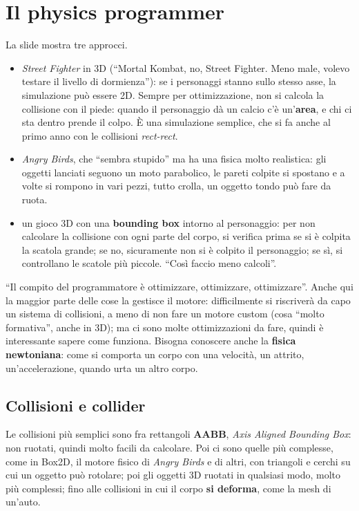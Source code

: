 \section{Il physics programmer}
\label{p5:sec:fisica}

La slide mostra tre approcci.
\begin{itemize}
  \item \emph{Street Fighter} in 3D (``Mortal Kombat, no, Street Fighter.
        Meno male, volevo testare il livello di dormienza''): se i personaggi
        stanno sullo stesso asse, la simulazione può essere 2D. Sempre per
        ottimizzazione, non si calcola la collisione con il piede: quando il
        personaggio dà un calcio c'è un'\textbf{area}, e chi ci sta dentro
        prende il colpo. È una simulazione semplice, che si fa anche al primo
        anno con le collisioni \emph{rect-rect}.
  \item \emph{Angry Birds}, che ``sembra stupido'' ma ha una fisica molto
        realistica: gli oggetti lanciati seguono un moto parabolico, le pareti
        colpite si spostano e a volte si rompono in vari pezzi, tutto crolla,
        un oggetto tondo può fare da ruota.
  \item un gioco 3D con una \textbf{bounding box} intorno al personaggio: per
        non calcolare la collisione con ogni parte del corpo, si verifica prima
        se si è colpita la scatola grande; se no, sicuramente non si è colpito
        il personaggio; se sì, si controllano le scatole più piccole. ``Così
        faccio meno calcoli''.
\end{itemize}
``Il compito del programmatore è ottimizzare, ottimizzare, ottimizzare''.
Anche qui la maggior parte delle cose la gestisce il motore: difficilmente si
riscriverà da capo un sistema di collisioni, a meno di non fare un motore
custom (cosa ``molto formativa'', anche in 3D); ma ci sono molte
ottimizzazioni da fare, quindi è interessante sapere come funziona. Bisogna
conoscere anche la \textbf{fisica newtoniana}: come si comporta un corpo con
una velocità, un attrito, un'accelerazione, quando urta un altro corpo.

\subsection{Collisioni e collider}

Le collisioni più semplici sono fra rettangoli \textbf{AABB}, \emph{Axis
Aligned Bounding Box}: non ruotati, quindi molto facili da calcolare. Poi ci
sono quelle più complesse, come in Box2D, il motore fisico di \emph{Angry
Birds} e di altri, con triangoli e cerchi su cui un oggetto può rotolare; poi
gli oggetti 3D ruotati in qualsiasi modo, molto più complessi; fino alle
collisioni in cui il corpo \textbf{si deforma}, come la mesh di un'auto.

